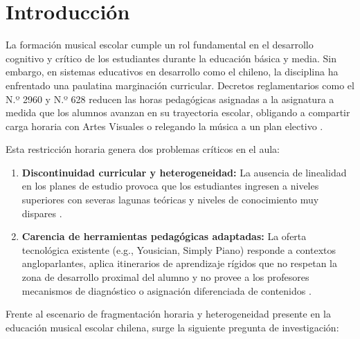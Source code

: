 \section{Introducción}

La formación musical escolar cumple un rol fundamental en el desarrollo cognitivo y crítico de los estudiantes durante la educación básica y media. Sin embargo, en sistemas educativos en desarrollo como el chileno, la disciplina ha enfrentado una paulatina marginación curricular. Decretos reglamentarios como el N.º 2960 y N.º 628 reducen las horas pedagógicas asignadas a la asignatura a medida que los alumnos avanzan en su trayectoria escolar, obligando a compartir carga horaria con Artes Visuales o relegando la música a un plan electivo \cite{mineduc_decreto2960_2012, mineduc_decreto628_2016}.

Esta restricción horaria genera dos problemas críticos en el aula:
\begin{enumerate}
    \item \textbf{Discontinuidad curricular y heterogeneidad:} La ausencia de linealidad en los planes de estudio provoca que los estudiantes ingresen a niveles superiores con severas lagunas teóricas y niveles de conocimiento muy dispares \cite{chandia_educacion_2025}.
    \item \textbf{Carencia de herramientas pedagógicas adaptadas:} La oferta tecnológica existente (e.g., Yousician, Simply Piano) responde a contextos angloparlantes, aplica itinerarios de aprendizaje rígidos que no respetan la zona de desarrollo proximal del alumno y no provee a los profesores mecanismos de diagnóstico o asignación diferenciada de contenidos \cite{garcia2025, alrowais2025, li2025}.
\end{enumerate}


Frente al escenario de fragmentación horaria y heterogeneidad presente en la educación musical escolar chilena, surge la siguiente pregunta de investigación:

